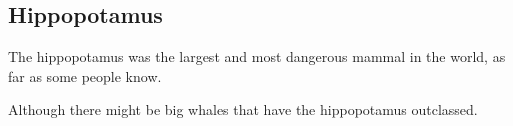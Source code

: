 \begin{comment}
  \subsection{Gargantuan Beast}
  Have Gargantuan Beasts, like the ones in the game \emph{Diablo II}. 
  
  They look kind of like bears on two legs, but with a short neck and a flat face. 
  They are herbivorous and mostly peaceful. 
\end{comment}














\subsection{Hippopotamus}
The {hippopotamus} was the largest and most dangerous mammal in the world, as far as some people know.

Although there might be big whales that have the hippopotamus outclassed. 













\begin{comment}
  \subsection{Lion}
  \Miith{} has sabre-toothed lions. 
  
  They were once widespread all over \hr{Velcad}{\Velcad}, but have been hunted to near extinction by humanoids. 
  Now they are rare. 
  
  No longer a menace, they have since been romanticized and idealized (from the \hs{Vaimon age}) as a \quo{king of animals}. 
\end{comment}
















